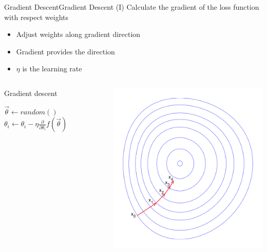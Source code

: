 \documentclass[10pt,compress]{beamer} %
\begin{document}
\begin{frame}{Gradient Descent}{Gradient Descent (I)}
	Calculate the gradient of the loss function with respect weights
	\begin{itemize}
		\item Adjust weights along gradient direction
		\item Gradient provides the direction
		\item $\eta$ is the \alert{learning rate}
	\end{itemize}

	\begin{columns}[c]

		\begin{block}{Gradient descent}
		\begin{algorithmic}[1]
		\State $\vec{\theta} \gets random()$
			\State $\theta_{i} \gets \theta_i - \eta \frac{\partial}{\partial \theta_i} f(\vec{\theta})$
			\EndFor
		\EndWhile
		\end{algorithmic}
		\end{block}

		\includegraphics[width=\linewidth]{figs/descent.png}
	\end{columns}
\end{frame}
\end{document}
